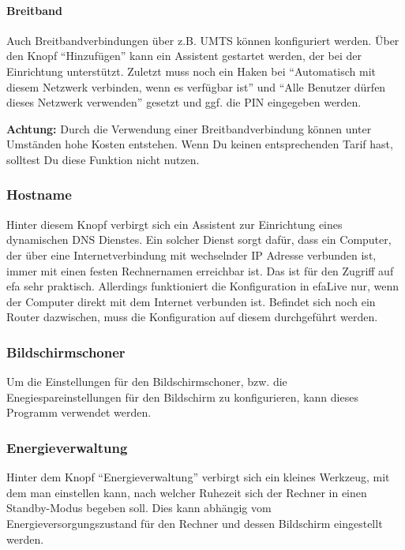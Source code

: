 \documentclass[a4paper,12pt,twoside]{article}
\begin{document}
\paragraph{Breitband}
\label{breitband}
Auch Breitbandverbindungen über z.B. UMTS können konfiguriert werden.
Über den Knopf "`Hinzufügen"' kann ein
Assistent gestartet werden, der bei der Einrichtung unterstützt.
Zuletzt muss noch ein Haken bei "`Automatisch mit diesem Netzwerk 
verbinden, wenn es verfügbar ist"' und "`Alle Benutzer dürfen 
dieses Netzwerk verwenden"' gesetzt und ggf. die PIN eingegeben werden.

\bigskip
\textbf{Achtung:} Durch die Verwendung einer Breitbandverbindung können unter
Umständen hohe Kosten entstehen. Wenn Du keinen entsprechenden Tarif
hast, solltest Du diese Funktion nicht nutzen.
\bigskip

\subsubsection{Hostname}
\label{sct:ddns}
Hinter diesem Knopf verbirgt sich ein Assistent zur Einrichtung eines
dynamischen DNS Dienstes. Ein solcher Dienst sorgt dafür, dass ein
Computer, der über eine Internetverbindung mit wechselnder IP Adresse
verbunden ist, immer mit einen festen Rechnernamen erreichbar ist. Das
ist für den Zugriff auf efa sehr praktisch. Allerdings funktioniert die
Konfiguration in efaLive nur, wenn der Computer direkt mit dem Internet
verbunden ist. Befindet sich noch ein Router dazwischen, muss die
Konfiguration auf diesem durchgeführt werden.


\subsubsection{Bildschirmschoner}
\label{bildschirmschoner}
Um die Einstellungen für den Bildschirmschoner, bzw. die
Enegiespareinstellungen für den Bildschirm zu konfigurieren, kann
dieses Programm verwendet werden.


\subsubsection{Energieverwaltung}
\label{sct:power_management}
Hinter dem Knopf "`Energieverwaltung"' verbirgt sich ein kleines Werkzeug, 
mit dem man einstellen kann, nach welcher Ruhezeit sich der Rechner in einen 
Standby-Modus begeben soll. Dies kann abhängig vom Energieversorgungszustand 
für den Rechner und dessen Bildschirm eingestellt werden.
\end{document}
